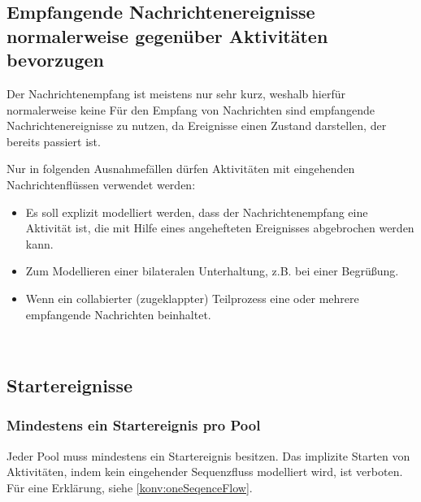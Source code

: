 \documentclass[12pt,report]{../../Templates/snetTeaching}
\begin{document}
\begin{Rahmen}
	\hfill
\end{Rahmen}


\clearpage
\subsection{Empfangende Nachrichtenereignisse normalerweise gegenüber Aktivitäten bevorzugen}
\label{konv:receivingMessageEvents}

Der Nachrichtenempfang ist meistens nur sehr kurz, weshalb hierfür normalerweise keine 
Für den Empfang von Nachrichten sind empfangende Nachrichtenereignisse zu nutzen, da Ereignisse einen Zustand darstellen, der bereits passiert ist.


Nur in folgenden Ausnahmefällen dürfen Aktivitäten mit eingehenden Nachrichtenflüssen verwendet werden:
\begin{itemize}
	\item Es soll explizit modelliert werden, dass der Nachrichtenempfang eine Aktivität ist, die mit Hilfe eines angehefteten Ereignisses abgebrochen werden kann.
	\item Zum Modellieren einer bilateralen Unterhaltung, z.B. bei einer Begrüßung.
	\item Wenn ein collabierter (zugeklappter) Teilprozess eine oder mehrere empfangende Nachrichten beinhaltet. 
\end{itemize}

\begin{Rahmen}
	\hfill
	\\
	\hfill
\end{Rahmen}



\clearpage
\subsection{Startereignisse}

\subsubsection{Mindestens ein Startereignis pro Pool}
\label{konv:oneStartEvent}

Jeder Pool muss mindestens ein Startereignis besitzen. Das implizite Starten von Aktivitäten, indem kein eingehender Sequenzfluss modelliert wird, ist verboten. Für eine Erklärung, siehe \ref{konv:oneSeqenceFlow}.
\end{document}
